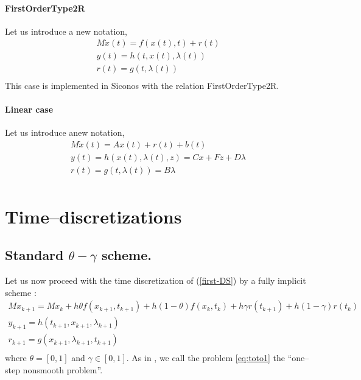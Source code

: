 \paragraph{FirstOrderType2R}
Let us introduce a new notation, 
\begin{equation}
\begin{array}{l}
M \dot{x}(t) = f(x(t),t) + r(t)  \\[2mm]
y(t) = h(t,x(t),\lambda (t)) \\[2mm]
r(t) = g(t,\lambda (t) ) \\[2mm]
\end{array}
\label{first-DS2}
\end{equation}
This case is implemented in Siconos with the relation FirstOrderType2R.




\paragraph{Linear case }Let us introduce anew notation, 
\begin{equation}
\begin{array}{l}
M \dot{x}(t) = Ax(t) + r(t)  +b(t)\\[2mm]
y(t) = h(x(t),\lambda (t),z) = Cx + Fz + D \lambda  \\[2mm]
r(t) = g(t,\lambda (t) ) = B \lambda \\[2mm]
\end{array}
\label{fisrt-DS3}
\end{equation}


\section{Time--discretizations} 



\subsection{Standard $\theta-\gamma$ scheme.}
Let us now proceed with the time discretization of (\ref{first-DS}) by a fully implicit scheme : 
\begin{equation}
  \begin{array}{l}
    \label{eq:toto1}
     M x_{k+1} = M x_{k} +h\theta f(x_{k+1},t_{k+1})+h(1-\theta) f(x_k,t_k) + h \gamma r(t_{k+1})
     + h(1-\gamma)r(t_k)  \\[2mm]
     y_{k+1} =  h(t_{k+1},x_{k+1},\lambda _{k+1}) \\[2mm]
     r_{k+1} = g(x_{k+1},\lambda_{k+1},t_{k+1})\\[2mm]
  \end{array}
\end{equation}
where $\theta = [0,1]$ and $\gamma \in [0,1]$. As in \cite{acary2008}, we call the problem \eqref{eq:toto1} the ``one--step nonsmooth problem''.



